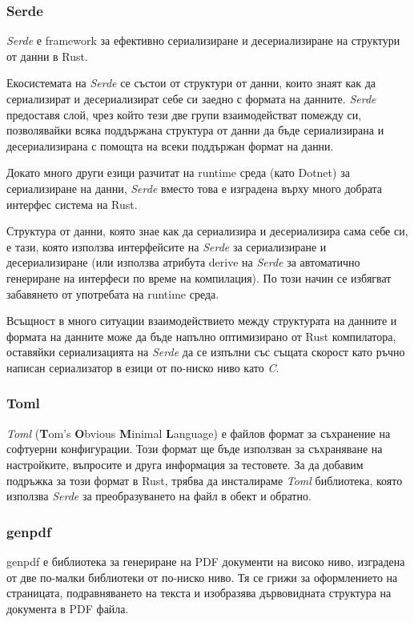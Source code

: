 \subsubsection{Serde}
\textit{Serde} е framework за ефективно сериализиране и десериализиране на структури от данни в Rust.

Екосистемата на \textit{Serde} се състои от структури от данни, които знаят как да
сериализират и десериализират себе си заедно с формата на данните. \textit{Serde} предоставя слой, чрез
който тези две групи взаимодействат помежду си, позволявайки всяка поддържана
структура от данни да бъде сериализирана и десериализирана с помощта на всеки
поддържан формат на данни.

Докато много други езици разчитат на runtime среда (като Dotnet) за
сериализиране на данни, \textit{Serde} вместо това е изградена върху много добрата
интерфес система на Rust.

Структура от данни, която знае как да сериализира и десериализира сама себе си,
е тази, която използва интерфейсите на \textit{Serde} за сериализиране и десериализиране
(или използва атрибута derive на \textit{Serde} за автоматично генериране на интерфеси
по време на компилация). По този начин се избягват забавянето от употребата на
runtime среда.

Всъщност в много ситуации взаимодействието между структурата на данните и
формата на данните може да бъде напълно оптимизирано от Rust компилатора,
оставяйки сериализацията на \textit{Serde} да се изпълни със същата скорост като
ръчно написан сериализатор в езици от по-ниско ниво като \textit{C}.

\subsubsection{Toml}
\textit{Toml} (\textbf{T}om's \textbf{O}bvious \textbf{M}inimal \textbf{L}anguage) е
файлов формат за съхранение на софтуерни конфигурации. Този формат ще бъде
използван за съхраняване на настройките, въпросите и друга информация за
тестовете. За да добавим подръжка за този формат в Rust, трябва да инсталираме
\textit{Toml} библиотека, която използва \textit{Serde} за преобразуването на файл в
обект и обратно.


\subsubsection{genpdf}
genpdf е библиотека за генериране на PDF документи на високо ниво, изградена от
две по-малки библиотеки от по-ниско ниво. Тя се грижи за оформлението на
страницата, подравняването на текста и изобразява дървовидната структура на
документа в PDF файла.
